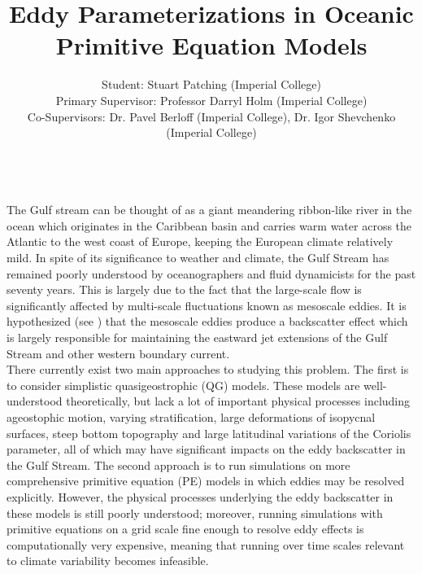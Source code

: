 \documentclass[10pt]{article}
\begin{document}
\title{\vspace{-4.0em}Eddy Parameterizations in Oceanic Primitive Equation Models}
\date{\vspace{-0.5em}}
\author{Student: Stuart Patching (Imperial College)\\
\small{Primary Supervisor: Professor Darryl Holm (Imperial College)}\\
\small{Co-Supervisors: Dr. Pavel Berloff (Imperial College), Dr. Igor Shevchenko (Imperial College)} \vspace{-2em}}
\maketitle
\textbf{ }\\
The Gulf stream can be thought of as a giant meandering ribbon-like river in the ocean which originates in the Caribbean basin and carries warm water across the Atlantic to the west coast of Europe, keeping the European climate relatively mild. In spite of its significance to weather and climate, the Gulf Stream has remained poorly understood by oceanographers and fluid dynamicists for the past seventy years. This is largely due to the fact that the large-scale flow is significantly affected by multi-scale fluctuations known as mesoscale eddies. It is hypothesized (see \cite{i}) that the mesoscale eddies produce a backscatter effect which is largely responsible for maintaining the eastward jet extensions of the Gulf Stream and other western boundary current. \\
\linebreak
There currently exist two main approaches to studying this problem. The first is to consider simplistic quasigeostrophic (QG) models. These models are well-understood theoretically, but lack a lot of important physical processes including ageostophic motion, varying stratification, large deformations of isopycnal surfaces, steep bottom topography and large latitudinal variations of the Coriolis parameter, all of which may have significant impacts on the eddy backscatter in the Gulf Stream. The second approach is to run simulations on more comprehensive primitive equation (PE) models in which eddies may be resolved explicitly. However, the physical processes underlying the eddy backscatter in these models is still poorly understood; moreover, running simulations with primitive equations on a grid scale fine enough to resolve eddy effects is computationally very expensive, meaning that running over time scales relevant to climate variability becomes infeasible. \\
\end{document}
